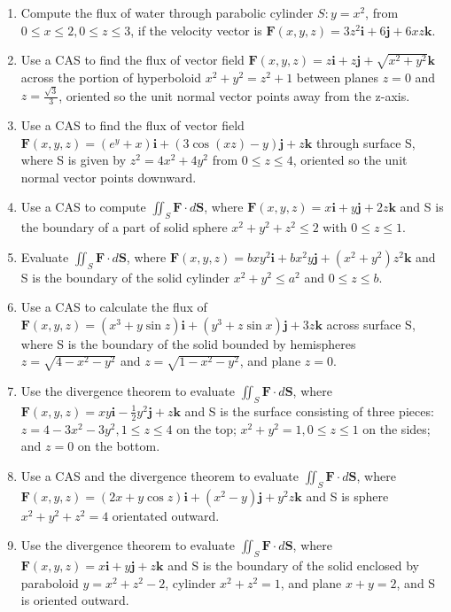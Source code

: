 \documentclass{exercises}
\begin{document}
\begin{enumerate}[resume]
\item Compute the flux of water through parabolic cylinder $S:y=x^{2}$, from $0\le x\le2,0\le z\le3$, if the velocity vector is $\mathbf{F}(x,y,z)=3z^{2}\mathbf{i}+6\mathbf{j}+6xz\mathbf{k}$.
\item \techrequired Use a CAS to find the flux of vector field $\mathbf{F}(x,y,z)=z\mathbf{i}+z\mathbf{j}+\sqrt{x^{2}+y^{2}}\mathbf{k}$ across the portion of hyperboloid $x^{2}+y^{2}=z^{2}+1$ between planes $z=0$ and $z=\frac{\sqrt{3}}{3}$, oriented so the unit normal vector points away from the z-axis.
\item \techrequired Use a CAS to find the flux of vector field $\mathbf{F}(x,y,z)=(e^{y}+x)\mathbf{i}+(3\cos(xz)-y)\mathbf{j}+z\mathbf{k}$ through surface S, where S is given by $z^{2}=4x^{2}+4y^{2}$ from $0\le z\le4$, oriented so the unit normal vector points downward.
\item \techrequired Use a CAS to compute $\iint_{S}\mathbf{F}\cdot d\mathbf{S}$, where $\mathbf{F}(x,y,z)=x\mathbf{i}+y\mathbf{j}+2z\mathbf{k}$ and S is the boundary of a part of solid sphere $x^{2}+y^{2}+z^{2}\le2$ with $0\le z\le1$.
\item Evaluate $\iint_{S}\mathbf{F}\cdot d\mathbf{S}$, where $\mathbf{F}(x,y,z)=bxy^{2}\mathbf{i}+bx^{2}y\mathbf{j}+(x^{2}+y^{2})z^{2}\mathbf{k}$ and S is the boundary of the solid cylinder $x^{2}+y^{2}\le a^{2}$ and $0\le z\le b$.
\item \techrequired Use a CAS to calculate the flux of $\mathbf{F}(x,y,z)=(x^{3}+y\sin z)\mathbf{i}+(y^{3}+z\sin x)\mathbf{j}+3z\mathbf{k}$ across surface S, where S is the boundary of the solid bounded by hemispheres $z=\sqrt{4-x^{2}-y^{2}}$ and $z=\sqrt{1-x^{2}-y^{2}}$, and plane $z=0$.
\item Use the divergence theorem to evaluate $\iint_{S}\mathbf{F}\cdot d\mathbf{S}$, where $\mathbf{F}(x,y,z)=xy\mathbf{i}-\frac{1}{2}y^{2}\mathbf{j}+z\mathbf{k}$ and S is the surface consisting of three pieces: $z=4-3x^{2}-3y^{2},1\le z\le4$ on the top; $x^{2}+y^{2}=1,0\le z\le1$ on the sides; and $z=0$ on the bottom.
\item \techrequired Use a CAS and the divergence theorem to evaluate $\iint_{S}\mathbf{F}\cdot d\mathbf{S}$, where $\mathbf{F}(x,y,z)=(2x+y\cos z)\mathbf{i}+(x^{2}-y)\mathbf{j}+y^{2}z\mathbf{k}$ and S is sphere $x^{2}+y^{2}+z^{2}=4$ orientated outward.
\item Use the divergence theorem to evaluate $\iint_{S}\mathbf{F}\cdot d\mathbf{S}$, where $\mathbf{F}(x,y,z)=x\mathbf{i}+y\mathbf{j}+z\mathbf{k}$ and S is the boundary of the solid enclosed by paraboloid $y=x^{2}+z^{2}-2$, cylinder $x^{2}+z^{2}=1$, and plane $x+y=2$, and S is oriented outward.
\end{enumerate}
\end{document}
